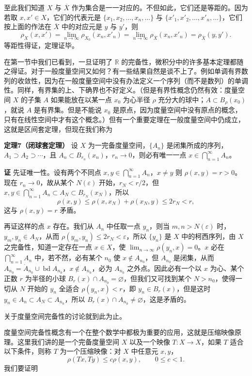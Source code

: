 至此我们知道 $X$ 与 $\overline X$ 作为集合是一一对应的。不但如此，它们还是等距的。因为若取 $x,x'\in X$，它们的代表元是 $\{x_1,x_2,\ldots,x_n,\ldots\}$ 与 $\{x'_1,x'_2,\ldots,x'_n,\ldots\}$，它们按上面的作法在 $\overline X$ 中的对应元是 $y$ 与 $y'$，则
\[
 \rho_X(x,x')=\lim_{n\to\infty}\rho_{X_0}(x_n,x'_n)
 =\lim_{n\to\infty}\rho_{\overline X}(x_n,x'_n)
 =\rho_{\overline X}(y,y').
\]
等距性得证，定理证毕。

在第一节中我们已看到，一旦证明了 $\mathbb R$ 的完备性，微积分中的许多基本定理都随之得证。对于一般度量空间又如何？有一些结果自然是谈不上了。例如单调有界数列的收敛性，因为在一般度量空间中没有办法定义一个序列（而不是数列）的单调性。同样，有界集的上、下确界也不好定义。（但是有界性概念仍然有效：度量空间 $X$ 的子集 $A$ 如果能放在以某一点 $x_0$ 为心半径 $\rho$ 充分大的球中；$A\subset B_\rho(x_0)$，就说 $A$ 是有界集。但是不能说 $x_0$ 是原点，因为度量空间中没有原点的概念，只有在线性空间中才有这个概念。）但有一个重要定理在一般度量空间中仍成立，这就是区间套定理，但现在我们称为

\noindent\textbf{定理7（闭球套定理）}\quad
设 $X$ 为一完备度量空间，$\{A_n\}$ 是闭集所成的序列，$A_1\supset A_2\supset\cdots$，且 $A_n\subset B_{r_n}(x_n)$，$r_n\to0$，则必有唯一一点 $x\in\bigcap_{n=1}^\infty A_n$。

\noindent\textbf{证}\quad
先证唯一性。设有两个不同点 $x,y\in\bigcap_{n=1}^\infty A_n$，$x\ne y$ 则 $\rho(x,y)=r>0$。现在 $r_n\to0$，故从某个 $N(\varepsilon)$ 开始，$r_N<r/2$，但 $x,y\in\bigcap_{n=1}^\infty A_n\subset A_N\subset B_{r_N}(x_N)$，所以
\[
 \rho(x,y)\le\rho(x,x_N)+\rho(x_N,y)\le2r_N<r,
\]
这与 $\rho(x,y)=r$ 矛盾。

再证这样的点 $x$ 存在。我们从 $A_n$ 中任取一点 $y_n$，则当 $m,n>N(\varepsilon)$ 时，$y_m,y_n\in A_N$，从而 $\rho(y_m,y_n)\le2r_N<\varepsilon$，所以 $\{y_n\}$ 是 $X$ 中的柯西序列，由 $X$ 之完备性，知道一定存在一点 $x\in X$，使 $\lim_{n\to\infty}\rho(y_n,x)=0$。$x$ 必在 $\bigcap_{n=1}^\infty A_n$ 中，若不然，必有某个 $n_0$ 使 $x\notin A_{n_0}$，但 $A_{n_0}$ 是闭集，从而 $A_{n_0}=\mathring A_{n_0}\cup\operatorname{bd}A_{n_0}$，$x\notin A_{n_0}$，必为 $A_{n_0}$ 之外点。因此必有一个以 $x$ 为心、某个正数 $r$ 为半径的小球 $B_r(x)\cap A_{n_0}=\varnothing$，但我们又可找到某个 $N>n_0$，使得一切从 $N$ 开始的 $y_n$ 全适合 $\rho(y_n,x)<r$，即 $y_n\in B_r(x)$，但是这时 $y_n\in A_n\subset A_N\subset A_{n_0}$，所以 $B_r(x)\cap A_{n_0}\ne\varnothing$，这是矛盾的。

关于度量空间完备性的讨论就到此为止。

度量空间完备性概念有一个在整个数学中都极为重要的应用，这就是压缩映像原理。这里我们讲的是一个完备度量空间 $X$ 以及一个映像 $T:X\to X$，如果 $T$ 适合以下条件，则称 $T$ 为一个压缩映像：对 $X$ 中任意元 $x,y$，
\begin{equation}
 \rho(Tx,Ty)\le c\rho(x,y),\qquad 0\le c<1.
 \tag{13}
\end{equation}
我们要证明

